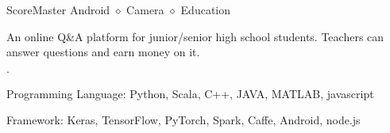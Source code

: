 \documentclass{joel_cv}
\begin{document}
\begin{proj}{ScoreMaster}
	{Android $\diamond$ Camera $\diamond$ Education}
	\item An online Q\&A platform for junior/senior high school students. Teachers can answer questions and earn money on it.
\end{proj}

%
%

\begin{sectionItemize}{$\cdot$}
	\item Programming Language: Python, Scala, C++, JAVA, MATLAB, javascript
	\item Framework: Keras, TensorFlow, PyTorch, Spark, Caffe, Android, node.js
\end{sectionItemize}
\end{document}
